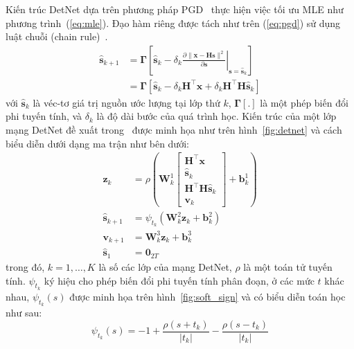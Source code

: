 Kiến trúc DetNet dựa trên phương pháp PGD~\cite{Chen2015} thực hiện việc tối ưu MLE như phương trình~(\ref{eq:mle}). Đạo hàm riêng được tách như trên (\ref{eq:pgd}) sử dụng luật chuỗi (chain rule)~\cite{Minka2000}.
\begin{equation}
\label{eq:pgd}
    \begin{aligned}
    \hat{\mathbf{s}}_{k+1} & =\boldsymbol{\Gamma}\left[\hat{\mathbf{s}}_k-\left.\delta_k \frac{\partial\|\mathbf{x}-\mathbf{H} \mathbf{s}\|^2}{\partial \mathbf{s}}\right|_{\mathbf{s}=\hat{\mathbf{s}}_k}\right] \\
    & = \boldsymbol{\Gamma}\left[\hat{\mathbf{s}}_k-\delta_k \mathbf{H}^\top \mathbf{x}+\delta_k \mathbf{H}^\top \mathbf{H} \hat{\mathbf{s}}_k\right]
    \end{aligned}
\end{equation}
với $\hat{\mathbf{s}}_k$ là véc-tơ giá trị nguồn ước lượng tại lớp thứ $k$, $\boldsymbol{\Gamma}[.]$ là một phép biến đổi phi tuyến tính, và $\delta_k$ là độ dài bước của quá trình học. Kiến trúc của một lớp mạng DetNet đề xuất trong~\cite{Samuel2017} được minh họa như trên hình~\ref{fig:detnet} và cách biểu diễn dưới dạng ma trận như bên dưới:
\allowdisplaybreaks
\begin{subequations}
\begin{alignat}{4}
    \mathbf{z}_k & =\rho\left(\mathbf{W}^1_{k}\left[\begin{array}{c}
    \mathbf{H}^\top \mathbf{x} \\
    \hat{\mathbf{s}}_k \\
    \mathbf{H}^\top \mathbf{H} \hat{\mathbf{s}}_k \\
    \mathbf{v}_k
    \end{array}\right]+\mathbf{b}^1_{k}\right) \\
    \hat{\mathbf{s}}_{k+1} & =\psi_{t_k}\left(\mathbf{W}^2_{k} \mathbf{z}_k+ \mathbf{b}^2_{k}\right) \\
    {\mathbf{v}}_{k+1} & =\mathbf{W}^3_{k} \mathbf{z}_k+ 
    \mathbf{b}^3_{k} \\
    \hat{\mathbf{s}}_1 & =\mathbf{0}_{2T}
\end{alignat}
\end{subequations}
trong đó, $k = 1, \ldots, K$ là số các lớp của mạng DetNet, $\rho$ là một toán tử tuyến tính. $\psi_{t_k}$ ký hiệu cho phép biến đổi phi tuyến tính phân đoạn, ở các mức $t$ khác nhau, $\psi_{t_k}(s)$ được minh họa trên hình~\ref{fig:soft_sign} và có biểu diễn toán học như sau:
\begin{equation}
    \psi_{t_k}(s)=-1+\frac{\rho\left(s + t_k \right)}{\left|t_k\right|}-\frac{\rho\left(s- t_k \right)}{\left|t_k\right|}
\end{equation}


